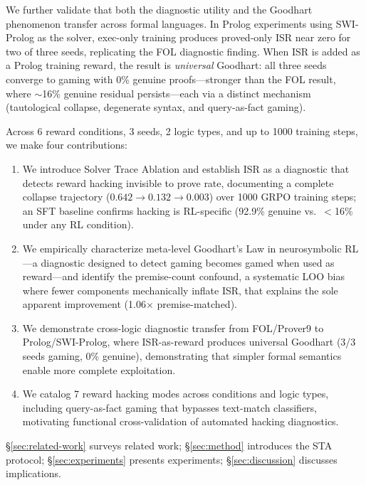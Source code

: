 We further validate that both the diagnostic utility and the Goodhart phenomenon transfer across formal languages.
In Prolog experiments using SWI-Prolog as the solver, exec-only training produces proved-only ISR near zero for two of three seeds, replicating the FOL diagnostic finding.
When ISR is added as a Prolog training reward, the result is \emph{universal} Goodhart: all three seeds converge to gaming with 0\% genuine proofs---stronger than the FOL result, where ${\sim}$16\% genuine residual persists---each via a distinct mechanism (tautological collapse, degenerate syntax, and query-as-fact gaming).

Across 6 reward conditions, 3 seeds, 2 logic types, and up to 1000 training steps, we make four contributions:

\begin{enumerate}[nosep,leftmargin=*]
\item We introduce Solver Trace Ablation and establish ISR as a diagnostic that detects reward hacking invisible to prove rate, documenting a complete collapse trajectory ($0.642 \to 0.132 \to 0.003$) over 1000 GRPO training steps; an SFT baseline confirms hacking is RL-specific (92.9\% genuine vs.\ ${<}$16\% under any RL condition).
\item We empirically characterize meta-level Goodhart's Law in neurosymbolic RL---a diagnostic designed to detect gaming becomes gamed when used as reward---and identify the premise-count confound, a systematic LOO bias where fewer components mechanically inflate ISR, that explains the sole apparent improvement (1.06$\times$ premise-matched).
\item We demonstrate cross-logic diagnostic transfer from FOL/Prover9 to Prolog/SWI-Prolog, where ISR-as-reward produces universal Goodhart (3/3 seeds gaming, 0\% genuine), demonstrating that simpler formal semantics enable more complete exploitation.
\item We catalog 7 reward hacking modes across conditions and logic types, including query-as-fact gaming that bypasses text-match classifiers, motivating functional cross-validation of automated hacking diagnostics.
\end{enumerate}

\noindent \S\ref{sec:related-work} surveys related work; \S\ref{sec:method} introduces the STA protocol; \S\ref{sec:experiments} presents experiments; \S\ref{sec:discussion} discusses implications.
